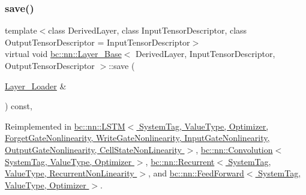 \mbox{\label{structbc_1_1nn_1_1Layer__Base_a9613e51db3c27e64ced09e41d2e7f15c}} 
\subsubsection{\texorpdfstring{save()}{save()}}
{\footnotesize\ttfamily template$<$class Derived\+Layer, class Input\+Tensor\+Descriptor, class Output\+Tensor\+Descriptor = Input\+Tensor\+Descriptor$>$ \\
virtual void \hyperlink{structbc_1_1nn_1_1Layer__Base}{bc\+::nn\+::\+Layer\+\_\+\+Base}$<$ Derived\+Layer, Input\+Tensor\+Descriptor, Output\+Tensor\+Descriptor $>$\+::save (\begin{DoxyParamCaption}\item[{\hyperlink{structbc_1_1nn_1_1Layer__Loader}{Layer\+\_\+\+Loader} \&}]{ }\end{DoxyParamCaption}) const\hspace{0.3cm}{\ttfamily [inline]}, {\ttfamily [virtual]}}



Reimplemented in \hyperlink{structbc_1_1nn_1_1LSTM_ae74b5038cc10d0ad236be07704d2999a}{bc\+::nn\+::\+L\+S\+T\+M$<$ System\+Tag, Value\+Type, Optimizer, Forget\+Gate\+Nonlinearity, Write\+Gate\+Nonlinearity, Input\+Gate\+Nonlinearity, Output\+Gate\+Nonlinearity, Cell\+State\+Non\+Linearity $>$}, \hyperlink{structbc_1_1nn_1_1Convolution_adf118eb4b92ed6f2df1ba31a0ce9e6e0}{bc\+::nn\+::\+Convolution$<$ System\+Tag, Value\+Type, Optimizer $>$}, \hyperlink{structbc_1_1nn_1_1Recurrent_aef30615b19b63bfc5d965a5799b7ad2c}{bc\+::nn\+::\+Recurrent$<$ System\+Tag, Value\+Type, Recurrent\+Non\+Linearity $>$}, and \hyperlink{structbc_1_1nn_1_1FeedForward_afd962933712eacd56880bbba0fb5948b}{bc\+::nn\+::\+Feed\+Forward$<$ System\+Tag, Value\+Type, Optimizer $>$}.

\mbox{\label{structbc_1_1nn_1_1Layer__Base_a7bcba1c84802ca8410ba4156c9bac64a}} 
